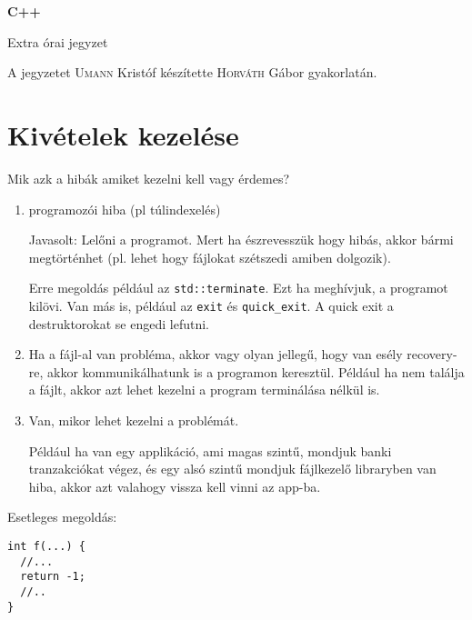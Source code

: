 \documentclass[a4paper,11.5pt]{article}
\begin{document}
	\setlength\parindent{0pt}
	\def\s{\hspace{0.2mm}\vphantom{\beta}}
	\def\Z{\mathbb{Z}}
	\def\Q{\mathbb{Q}}
	\def\R{\mathbb{R}}
	\def\C{\mathbb{C}}
	\def\N{\mathbb{N}}
	\def\Ra{\overline{\mathbb{R}}}
	
	\def\sume{\displaystyle\sum_{n=1}^{+\infty}}
	\def\sumn{\displaystyle\sum_{n=0}^{+\infty}}
	
	\def\narrow{\underset{n\rightarrow+\infty}{\longrightarrow}}
	\def\limn{\displaystyle\lim_{n\to +\infty}}
	\def\limx{\displaystyle\lim_{x\to +\infty}}
	
	\theoremstyle{definition}
	\newtheorem{theorem}{Tétel}[subsection] 
	
	\theoremstyle{definition}
	\newtheorem{definition}[theorem]{Definíció} 
	\newtheorem{example}[theorem]{Példa} 
	\newtheorem{task}[theorem]{Feladat} 
	\newtheorem{note}[theorem]{Megjegyzés}
	\begin{center}
		{\LARGE\textbf{C++}}
		
		{\Large Extra órai jegyzet}
	\end{center}
	A jegyzetet \textsc{Umann} Kristóf készítette \textsc{Horváth} Gábor gyakorlatán.
	\medskip
	
	\section{Kivételek kezelése}
	
	Mik azk a hibák amiket kezelni kell vagy érdemes? 
	
	\begin{enumerate}
		\item programozói hiba (pl túlindexelés)
		
		Javasolt: Lelőni a programot. Mert ha észrevesszük hogy hibás, akkor bármi megtörténhet (pl. lehet hogy fájlokat szétszedi amiben dolgozik).
		
		Erre megoldás például az \texttt{std::terminate}. Ezt ha meghívjuk, a programot kilövi. Van más is, például az \texttt{exit} és \texttt{quick\_exit}. A quick exit a destruktorokat se engedi lefutni.
		
		\item Ha a fájl-al van probléma, akkor vagy olyan jellegű, hogy van esély recovery-re, akkor kommunikálhatunk is a programon keresztül. Például ha nem találja a fájlt, akkor azt lehet kezelni a program terminálása nélkül is.
		
		\item Van, mikor lehet kezelni a problémát. 
		
		Például ha van egy applikáció, ami magas szintű, mondjuk banki tranzakciókat végez, és egy alsó szintű mondjuk fájlkezelő libraryben van hiba, akkor azt valahogy vissza kell vinni az app-ba.
		
	\end{enumerate}
		Esetleges megoldás:
		\begin{lstlisting}
int f(...) {
  //...
  return -1;
  //..
}
		\end{lstlisting}
\end{document}
